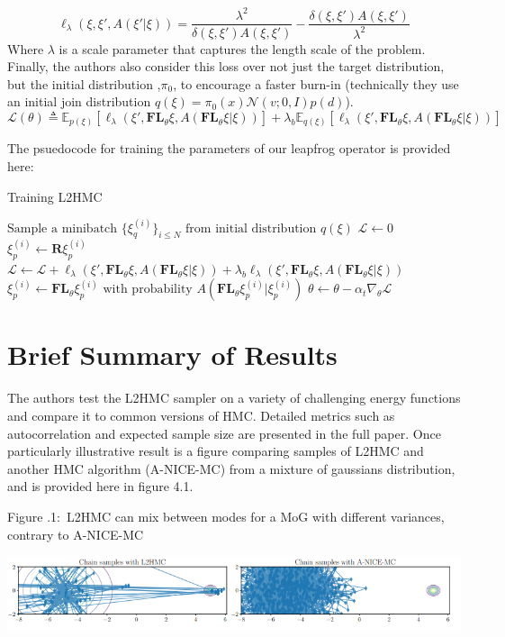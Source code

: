 \documentclass[twoside]{article}
\newcounter{lecnum}
\newcommand{\fig}[3]{
			\vspace{#2}
			\begin{center}
			Figure \thelecnum.#1:~#3
			\end{center}
	}
\begin{document}
\begin{equation*}
    \ell_{\lambda} (\xi, \xi', A(\xi'|\xi)) = \frac{\lambda^2}{\delta(\xi,\xi')A(\xi,\xi')} -\frac{\delta(\xi,\xi')A(\xi,\xi')}{\lambda^2}
\end{equation*}
Where $\lambda$ is a scale parameter that captures the length scale of the problem. Finally, the authors also consider this loss over not just the target distribution, but the initial distribution ,$\pi_0$, to encourage a faster burn-in (technically they use an initial join distribution $q(\xi) = \pi_0(x)\mathcal{N}(v;0,I)p(d)$).
\begin{equation*}
    \mathcal{L}(\theta) \triangleq \mathbb{E}_{p(\xi)}[\ell_{\lambda}(\xi', \textbf{FL}_\theta \xi, A(\textbf{FL}_\theta \xi | \xi))] + \lambda_b \mathbb{E}_{q(\xi)}[\ell_{\lambda}(\xi', \textbf{FL}_\theta \xi, A(\textbf{FL}_\theta \xi | \xi))]
\end{equation*}

The psuedocode for training the parameters of our leapfrog operator is provided here:

\begin{algorithm}[H]
\caption{Training L2HMC}
\label{L2HMCalgorithm}
\begin{algorithmic}[1]
    \State $\text{Sample a minibatch } \{ \xi_q^{(i)} \}_{i\leq N}  \text{ from initial distribution } q(\xi) $
    \State $\mathcal{L} \leftarrow 0$
        \State $\xi_p^{(i)} \leftarrow \textbf{R}\xi_p^{(i)}$
        \State $\mathcal{L} \leftarrow \mathcal{L} + \ell_{\lambda}(\xi', \textbf{FL}_\theta \xi, A(\textbf{FL}_\theta \xi | \xi)) + \lambda_b \ell_{\lambda}(\xi', \textbf{FL}_\theta \xi, A(\textbf{FL}_\theta \xi | \xi)) $
        \State $\xi_p^{(i)} \leftarrow \textbf{FL}_\theta \xi_p^{(i)} \text{ with probability } A(\textbf{FL}_\theta \xi_p^{(i)}|\xi_p^{(i)})$
    \EndFor
    \State $\theta \leftarrow \theta - \alpha_t \nabla_\theta \mathcal{L}$
\EndFor
\end{algorithmic}
\end{algorithm}


\section{Brief Summary of Results}
The authors test the L2HMC sampler on a variety of challenging energy functions and compare it to common versions of HMC. Detailed metrics such as autocorrelation and expected sample size are presented in the full paper. Once particularly illustrative result is a figure comparing samples of L2HMC and another HMC algorithm (A-NICE-MC) from a mixture of gaussians distribution, and is provided here in figure 4.1.


\fig{1}{0.2in}{L2HMC can mix between modes for a MoG with different variances, contrary to A-NICE-MC}
\includegraphics[width=\textwidth]{L2HMC-results.PNG}










\end{document}
